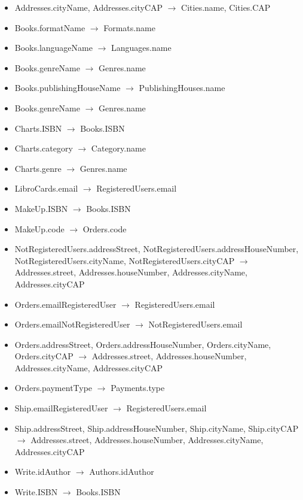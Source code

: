 \documentclass[a4paper,11pt]{report}
\begin{document}
{
    \raggedright
    
    \begin{itemize}
        \item Addresses.cityName, Addresses.cityCAP $\rightarrow$ Cities.name, Cities.CAP
        \item Books.formatName $\rightarrow$ Formats.name
        \item Books.languageName $\rightarrow$ Languages.name
        \item Books.genreName $\rightarrow$ Genres.name
        \item Books.publishingHouseName $\rightarrow$ PublishingHouses.name
        \item Books.genreName $\rightarrow$ Genres.name
        \item Charts.ISBN $\rightarrow$ Books.ISBN
        \item Charts.category $\rightarrow$ Category.name
        \item Charts.genre $\rightarrow$ Genres.name
        \item LibroCards.email $\rightarrow$ RegisteredUsers.email
        \item MakeUp.ISBN $\rightarrow$ Books.ISBN
        \item MakeUp.code $\rightarrow$ Orders.code
        \item NotRegisteredUsers.addressStreet, NotRegisteredUsers.addressHouseNumber, NotRegisteredUsers.cityName,
        NotRegisteredUsers.cityCAP $\rightarrow$ Addresses.street, Addresses.houseNumber, Addresses.cityName, Addresses.cityCAP
        \item Orders.emailRegisteredUser $\rightarrow$ RegisteredUsers.email
        \item Orders.emailNotRegisteredUser $\rightarrow$ NotRegisteredUsers.email
        \item Orders.addressStreet, Orders.addressHouseNumber, Orders.cityName, Orders.cityCAP $\rightarrow$ Addresses.street, Addresses.houseNumber, Addresses.cityName, Addresses.cityCAP
        \item Orders.paymentType $\rightarrow$ Payments.type
        \item Ship.emailRegisteredUser $\rightarrow$ RegisteredUsers.email
        \item Ship.addressStreet, Ship.addressHouseNumber, Ship.cityName, Ship.cityCAP $\rightarrow$ Addresses.street, Addresses.houseNumber, Addresses.cityName, Addresses.cityCAP
        \item Write.idAuthor $\rightarrow$ Authors.idAuthor
        \item Write.ISBN $\rightarrow$ Books.ISBN
    \end{itemize}
}
\end{document}

